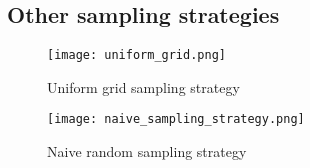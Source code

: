\documentclass[11pt]{article}
\begin{document}
\fi

\begin{appendices}


\section{Other sampling strategies}\label{section: Appendix-sample}
\begin{figure}[h!]
  \begin{center}
  \caption{Uniform grid sampling strategy} 
  \label{fig: uniform_grid}
  \texttt{[image: uniform\_grid.png]}
  \end{center}
  \end{figure}

  \begin{figure}[h!]
    \begin{center}
    \caption{Naive random sampling strategy} 
    \label{fig: random_sample}
    \texttt{[image: naive\_sampling\_strategy.png]}
    \end{center}
    \end{figure}


\end{appendices}
\end{document}
